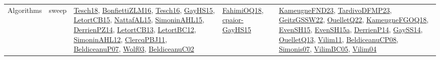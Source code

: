 {\begin{longtable}{llp{6cm}p{6cm}p{6cm}}
Algorithms & sweep & \href{papers/Tesch18.pdf}{Tesch18}\cite{Tesch18}, \href{papers/BonfiettiZLM16.pdf}{BonfiettiZLM16}\cite{BonfiettiZLM16}, \href{papers/Tesch16.pdf}{Tesch16}\cite{Tesch16}, \href{papers/GayHS15.pdf}{GayHS15}\cite{GayHS15}, \href{articles/LetortCB15.pdf}{LetortCB15}\cite{LetortCB15}, \href{articles/NattafAL15.pdf}{NattafAL15}\cite{NattafAL15}, \href{articles/SimoninAHL15.pdf}{SimoninAHL15}\cite{SimoninAHL15}, \href{papers/DerrienPZ14.pdf}{DerrienPZ14}\cite{DerrienPZ14}, \href{papers/LetortCB13.pdf}{LetortCB13}\cite{LetortCB13}, \href{papers/LetortBC12.pdf}{LetortBC12}\cite{LetortBC12}, \href{papers/SimoninAHL12.pdf}{SimoninAHL12}\cite{SimoninAHL12}, \href{papers/ClercqPBJ11.pdf}{ClercqPBJ11}\cite{ClercqPBJ11}, \href{papers/BeldiceanuP07.pdf}{BeldiceanuP07}\cite{BeldiceanuP07}, \href{papers/Wolf03.pdf}{Wolf03}\cite{Wolf03}, \href{papers/BeldiceanuC02.pdf}{BeldiceanuC02}\cite{BeldiceanuC02} & \href{articles/FahimiOQ18.pdf}{FahimiOQ18}\cite{FahimiOQ18}, \href{papers/cpaior-GayHS15.pdf}{cpaior-GayHS15}\cite{cpaior-GayHS15} & \href{papers/KameugneFND23.pdf}{KameugneFND23}\cite{KameugneFND23}, \href{papers/TardivoDFMP23.pdf}{TardivoDFMP23}\cite{TardivoDFMP23}, \href{papers/GeitzGSSW22.pdf}{GeitzGSSW22}\cite{GeitzGSSW22}, \href{papers/OuelletQ22.pdf}{OuelletQ22}\cite{OuelletQ22}, \href{papers/KameugneFGOQ18.pdf}{KameugneFGOQ18}\cite{KameugneFGOQ18}, \href{papers/EvenSH15.pdf}{EvenSH15}\cite{EvenSH15}, \href{articles/EvenSH15a.pdf}{EvenSH15a}\cite{EvenSH15a}, \href{papers/DerrienP14.pdf}{DerrienP14}\cite{DerrienP14}, \href{papers/GaySS14.pdf}{GaySS14}\cite{GaySS14}, \href{papers/OuelletQ13.pdf}{OuelletQ13}\cite{OuelletQ13}, \href{papers/Vilim11.pdf}{Vilim11}\cite{Vilim11}, \href{papers/BeldiceanuCP08.pdf}{BeldiceanuCP08}\cite{BeldiceanuCP08}, \href{articles/Simonis07.pdf}{Simonis07}\cite{Simonis07}, \href{articles/VilimBC05.pdf}{VilimBC05}\cite{VilimBC05}, \href{papers/Vilim04.pdf}{Vilim04}\cite{Vilim04}\\

\end{longtable}}
